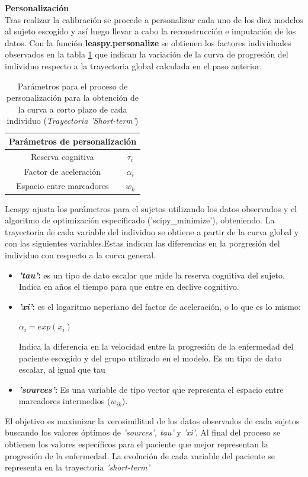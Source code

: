 \begin{description}
	\item \textbf{Personalización}\\
	Tras realizar la calibración se procede a personalizar cada uno de los diez modelos al sujeto escogido y así luego llevar a cabo la reconstrucción e imputación de los datos. Con la función \textbf{leaspy.personalize} se obtienen los factores individuales observados en la tabla \ref{tab:tabla7} que indican la variación de la curva de progresión del individuo respecto a la trayectoria global calculada en el paso anterior.
	
	\begin{table}[t]
		\centering
		\begin{tabular}{|c||c|} 
			\hline
			\multicolumn{2}{|c|}{Parámetros de personalización} \\
			\toprule
			Reserva cognitiva &  $\tau_{i}$\\ 
			\hline
			Factor de aceleración &  $\alpha_{i}$  \\
			\hline
			Espacio entre marcadores & $w_{k}$  \\
			
			\bottomrule
		\end{tabular}
		\caption{Parámetros para el proceso de personalización para la obtención de la curva a corto plazo de cada individuo (\textit{Trayectoria 'Short-term'})}
		\label{tab:tabla7}
	\end{table}
	
	Leaspy ajusta los parámetros para el sujetos utilizando los datos observados y el algoritmo de optimización especificado ('scipy\_minimize'), obteniendo. La trayectoria de cada variable del individuo se obtiene a partir de la curva global y con las siguientes variables.Estas indican las diferencias en la porgresión del individuo con respecto a la curva general.\\
	
	\begin{itemize}
		\item \textbf{\textit{'tau'}:} es un tipo de dato escalar que mide la reserva cognitiva del sujeto. Indica en años el tiempo para que entre en declive cognitivo. 
		\item \textbf{\textit{'xi'}:} es el logaritmo neperiano del factor de aceleración, o lo que es lo mismo:
		\begin{center}
			$\alpha_{i}=exp(x_{i})$
		\end{center}
		Indica la diferencia en la velocidad entre la progresión de la enfermedad del paciente escogido y del grupo utilizado en el modelo. Es un tipo de dato escalar, al igual que tau
		\item \textbf{\textit{'sources'}:} Es una variable de tipo vector que representa el espacio entre marcadores intermedios ($w_{ik}$).
	\end{itemize}
	 El objetivo es maximizar la verosimilitud de los datos observados de cada sujetos buscando los valores óptimos de \textit{'sources', tau'} y \textit{'xi'}. Al final del proceso se obtienen los valores específicos para el paciente que mejor representan la progresión de la enfermedad. La evolución de cada variable del paciente se representa en la trayectoria \textit{'short-term'}
	 

\end{description}
